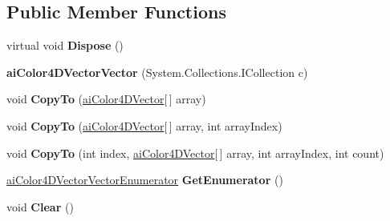 \subsection*{Public Member Functions}
\begin{DoxyCompactItemize}
\item 
\hypertarget{classai_color4_d_vector_vector_abca1832b82ba613727ce359568186247}{virtual void {\bfseries Dispose} ()}\label{classai_color4_d_vector_vector_abca1832b82ba613727ce359568186247}

\item 
\hypertarget{classai_color4_d_vector_vector_a31e8915a96650a976c83c220230f6f7e}{{\bfseries ai\+Color4\+D\+Vector\+Vector} (System.\+Collections.\+I\+Collection c)}\label{classai_color4_d_vector_vector_a31e8915a96650a976c83c220230f6f7e}

\item 
\hypertarget{classai_color4_d_vector_vector_adc4f6c782db4dd68ae33f7f991171319}{void {\bfseries Copy\+To} (\hyperlink{classai_color4_d_vector}{ai\+Color4\+D\+Vector}\mbox{[}$\,$\mbox{]} array)}\label{classai_color4_d_vector_vector_adc4f6c782db4dd68ae33f7f991171319}

\item 
\hypertarget{classai_color4_d_vector_vector_ac2daa4e8fb36c1b5e27877f18c556702}{void {\bfseries Copy\+To} (\hyperlink{classai_color4_d_vector}{ai\+Color4\+D\+Vector}\mbox{[}$\,$\mbox{]} array, int array\+Index)}\label{classai_color4_d_vector_vector_ac2daa4e8fb36c1b5e27877f18c556702}

\item 
\hypertarget{classai_color4_d_vector_vector_a07d26fb2bcba202729c3e379fd1808e8}{void {\bfseries Copy\+To} (int index, \hyperlink{classai_color4_d_vector}{ai\+Color4\+D\+Vector}\mbox{[}$\,$\mbox{]} array, int array\+Index, int count)}\label{classai_color4_d_vector_vector_a07d26fb2bcba202729c3e379fd1808e8}

\item 
\hypertarget{classai_color4_d_vector_vector_a55786ebe902e695014746d141fb1544b}{\hyperlink{classai_color4_d_vector_vector_1_1ai_color4_d_vector_vector_enumerator}{ai\+Color4\+D\+Vector\+Vector\+Enumerator} {\bfseries Get\+Enumerator} ()}\label{classai_color4_d_vector_vector_a55786ebe902e695014746d141fb1544b}

\item 
\hypertarget{classai_color4_d_vector_vector_ad42d85ae47d0c4e517d736142c3d79f1}{void {\bfseries Clear} ()}\label{classai_color4_d_vector_vector_ad42d85ae47d0c4e517d736142c3d79f1}


\end{DoxyCompactItemize}
